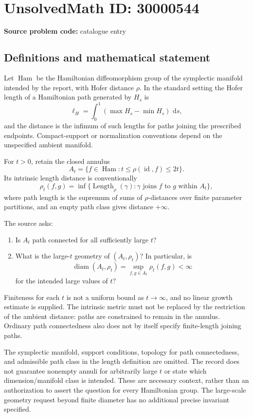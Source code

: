 \documentclass[11pt]{article}
\newcommand{\dd}{\,\mathrm{d}}
\begin{document}
\section*{UnsolvedMath ID: 30000544}
\textbf{Source problem code:} catalogue entry
\subsection{Definitions and mathematical statement}
Let $\operatorname{Ham}$ be the Hamiltonian diffeomorphism group of the symplectic manifold intended by the report, with Hofer distance $\rho$. In the standard setting the Hofer length of a Hamiltonian path generated by $H_s$ is
\[
 \ell_H=\int_0^1(\max H_s-\min H_s)\,\dd s,
\]
and the distance is the infimum of such lengths for paths joining the prescribed endpoints. Compact-support or normalization conventions depend on the unspecified ambient manifold.

For $t>0$, retain the closed annulus
\[
 A_t=\{f\in\operatorname{Ham}:t\le\rho(\operatorname{id},f)\le2t\}.
\]
Its intrinsic length distance is conventionally
\[
 \rho_t(f,g)=\inf\{\operatorname{Length}_\rho(\gamma):
 \gamma\text{ joins }f\text{ to }g\text{ within }A_t\},
\]
where path length is the supremum of sums of $\rho$-distances over finite parameter partitions, and an empty path class gives distance $+\infty$.

The source asks:
\begin{enumerate}
\item Is $A_t$ path connected for all sufficiently large $t$?
\item What is the large-$t$ geometry of $(A_t,\rho_t)$? In particular, is
\[
 \operatorname{diam}(A_t,\rho_t)
       =\sup_{f,g\in A_t}\rho_t(f,g)<\infty
\]
for the intended large values of $t$?
\end{enumerate}
Finiteness for each $t$ is not a uniform bound as $t\to\infty$, and no linear growth estimate is supplied. The intrinsic metric must not be replaced by the restriction of the ambient distance: paths are constrained to remain in the annulus. Ordinary path connectedness also does not by itself specify finite-length joining paths.

The symplectic manifold, support conditions, topology for path connectedness, and admissible path class in the length definition are omitted. The record does not guarantee nonempty annuli for arbitrarily large $t$ or state which dimension/manifold class is intended. These are necessary context, rather than an authorization to assert the question for every Hamiltonian group. The large-scale geometry request beyond finite diameter has no additional precise invariant specified.
\end{document}
